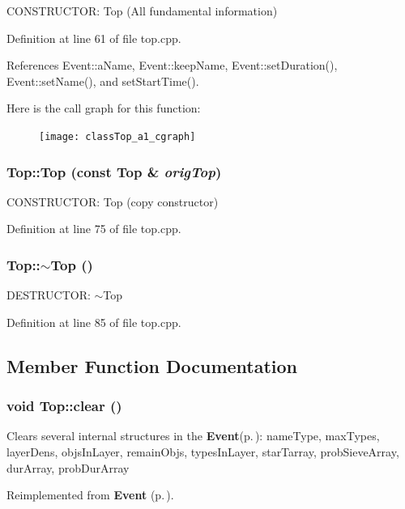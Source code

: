 CONSTRUCTOR: Top (All fundamental information) 

Definition at line 61 of file top.cpp.

References Event::a\-Name, Event::keep\-Name, Event::set\-Duration(), Event::set\-Name(), and set\-Start\-Time().

Here is the call graph for this function:\begin{figure}[H]
\begin{center}
\leavevmode
\texttt{[image: classTop\_a1\_cgraph]}
\end{center}
\end{figure}
\subsubsection{\setlength{\rightskip}{0pt plus 5cm}Top::Top (const {\bf Top} \& {\em orig\-Top})}\label{classTop_a2}


CONSTRUCTOR: Top (copy constructor) 

Definition at line 75 of file top.cpp.
\subsubsection{\setlength{\rightskip}{0pt plus 5cm}Top::$\sim${\bf Top} ()}\label{classTop_a3}


DESTRUCTOR: $\sim$Top 

Definition at line 85 of file top.cpp.

\subsection{Member Function Documentation}
\subsubsection{\setlength{\rightskip}{0pt plus 5cm}void Top::clear ()\hspace{0.3cm}{\tt  [virtual]}}\label{classTop_a4}


Clears several internal structures in the {\bf Event}{\rm (p.\,\pageref{classEvent})}: name\-Type, max\-Types, layer\-Dens, objs\-In\-Layer, remain\-Objs, types\-In\-Layer, star\-Tarray, prob\-Sieve\-Array, dur\-Array, prob\-Dur\-Array 

Reimplemented from {\bf Event} {\rm (p.\,\pageref{classEvent_a12})}.

